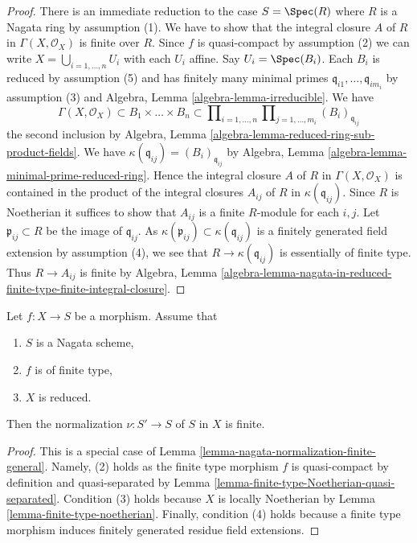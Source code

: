 \begin{proof}
There is an immediate reduction to the case $S = \Spec(R)$
where $R$ is a Nagata ring by assumption (1). We have to show that
the integral closure $A$ of $R$ in $\Gamma(X, \mathcal{O}_X)$ is
finite over $R$. Since $f$ is quasi-compact by assumption (2) we can write
$X = \bigcup_{i = 1, \ldots, n} U_i$ with each $U_i$ affine.
Say $U_i = \Spec(B_i)$. Each $B_i$ is reduced by assumption (5)
and has finitely many minimal primes
$\mathfrak q_{i1}, \ldots, \mathfrak q_{im_i}$
by assumption (3) and
Algebra, Lemma \ref{algebra-lemma-irreducible}.
We have
$$
\Gamma(X, \mathcal{O}_X) \subset B_1 \times \ldots \times B_n
\subset
\prod\nolimits_{i = 1, \ldots, n}
\prod\nolimits_{j = 1, \ldots, m_i} (B_i)_{\mathfrak q_{ij}}
$$
the second inclusion by
Algebra, Lemma \ref{algebra-lemma-reduced-ring-sub-product-fields}.
We have $\kappa(\mathfrak q_{ij}) = (B_i)_{\mathfrak q_{ij}}$ by
Algebra, Lemma \ref{algebra-lemma-minimal-prime-reduced-ring}.
Hence the integral closure $A$ of $R$ in $\Gamma(X, \mathcal{O}_X)$
is contained in the product of the integral closures $A_{ij}$ of
$R$ in $\kappa(\mathfrak q_{ij})$. Since $R$ is Noetherian
it suffices to show that $A_{ij}$ is a finite $R$-module for each $i, j$.
Let $\mathfrak p_{ij} \subset R$ be the image of $\mathfrak q_{ij}$.
As $\kappa(\mathfrak p_{ij}) \subset \kappa(\mathfrak q_{ij})$
is a finitely generated field extension by assumption (4),
we see that $R \to \kappa(\mathfrak q_{ij})$ is essentially of finite type.
Thus $R \to A_{ij}$ is finite by Algebra, Lemma
\ref{algebra-lemma-nagata-in-reduced-finite-type-finite-integral-closure}.
\end{proof}

\begin{lemma}
\label{lemma-nagata-normalization-finite}
Let $f : X \to S$ be a morphism. Assume that
\begin{enumerate}
\item $S$ is a Nagata scheme,
\item $f$ is of finite type,
\item $X$ is reduced.
\end{enumerate}
Then the normalization $\nu : S' \to S$ of $S$ in $X$ is finite.
\end{lemma}

\begin{proof}
This is a special case of
Lemma \ref{lemma-nagata-normalization-finite-general}.
Namely, (2) holds as the finite type morphism $f$ is quasi-compact
by definition and quasi-separated by
Lemma \ref{lemma-finite-type-Noetherian-quasi-separated}.
Condition (3) holds because $X$ is locally Noetherian by
Lemma \ref{lemma-finite-type-noetherian}. Finally, condition (4)
holds because a finite type morphism induces finitely generated
residue field extensions.
\end{proof}

